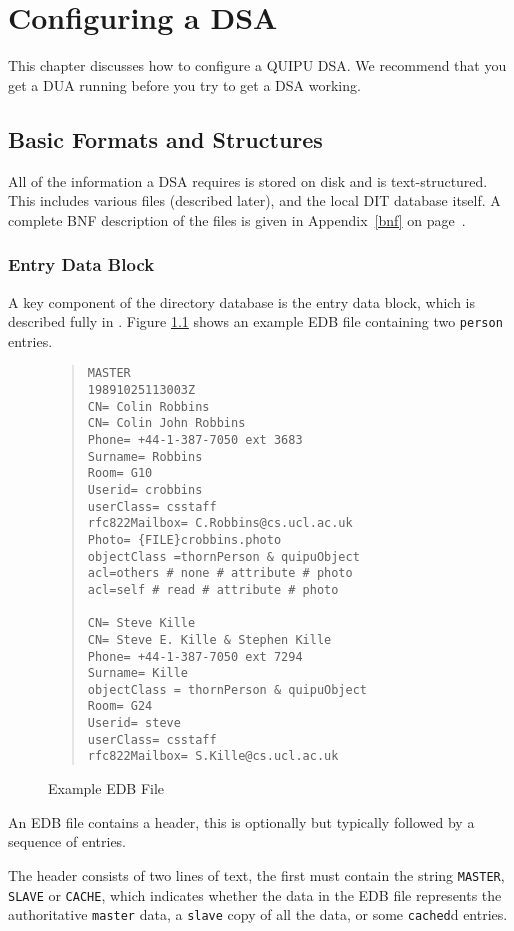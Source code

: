 \chapter {Configuring a DSA}

This chapter discusses how to configure a QUIPU DSA.
We recommend that you get a DUA running before you try to
get a DSA working.

\section{Basic Formats and Structures}

All of the information a DSA requires is
stored on disk and is text-structured.  This includes
various files (described later), and the local DIT database itself.
A complete BNF description of the files 
is given in Appendix~\ref{bnf} on page~\pageref{bnf}.

\subsection {Entry Data Block}
\label{edb}
A key component of the directory database is the entry data block, which is
described fully in \cite{QUIPU.Design}.
Figure \ref{example_edb} shows an example EDB  file containing two \verb+person+
entries.

\begin{figure}
\smaller
\begin{quote}\begin{verbatim}
MASTER
19891025113003Z
CN= Colin Robbins 
CN= Colin John Robbins 
Phone= +44-1-387-7050 ext 3683 
Surname= Robbins 
Room= G10 
Userid= crobbins
userClass= csstaff
rfc822Mailbox= C.Robbins@cs.ucl.ac.uk
Photo= {FILE}crobbins.photo 
objectClass =thornPerson & quipuObject
acl=others # none # attribute # photo 
acl=self # read # attribute # photo 

CN= Steve Kille 
CN= Steve E. Kille & Stephen Kille 
Phone= +44-1-387-7050 ext 7294 
Surname= Kille 
objectClass = thornPerson & quipuObject 
Room= G24 
Userid= steve
userClass= csstaff
rfc822Mailbox= S.Kille@cs.ucl.ac.uk
\end{verbatim}\end{quote}
\caption{Example EDB File}
\label{example_edb}
\end{figure}


An EDB file contains a header, this is optionally
but typically followed by a sequence of entries.

The header consists of two lines of text, the first must contain the string
\verb"MASTER", \verb"SLAVE" or \verb"CACHE", 
which indicates whether the data in the EDB
file represents the authoritative \verb"master" data, a \verb"slave"
copy of all the data, or some \verb"cached"d entries.

